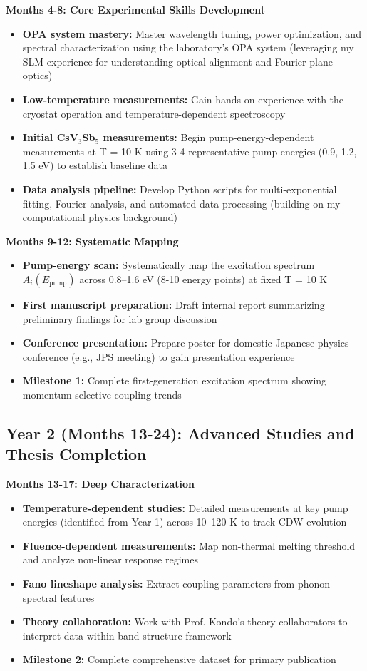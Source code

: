 \documentclass[12pt,a4paper]{article}
\begin{document}
\textbf{Months 4-8: Core Experimental Skills Development}
\begin{itemize}
    \item \textbf{OPA system mastery:} Master wavelength tuning, power optimization, and spectral characterization using the laboratory's OPA system (leveraging my SLM experience for understanding optical alignment and Fourier-plane optics)
    \item \textbf{Low-temperature measurements:} Gain hands-on experience with the cryostat operation and temperature-dependent spectroscopy
    \item \textbf{Initial CsV$_3$Sb$_5$ measurements:} Begin pump-energy-dependent measurements at T = 10 K using 3-4 representative pump energies (0.9, 1.2, 1.5 eV) to establish baseline data
    \item \textbf{Data analysis pipeline:} Develop Python scripts for multi-exponential fitting, Fourier analysis, and automated data processing (building on my computational physics background)
\end{itemize}

\textbf{Months 9-12: Systematic Mapping}
\begin{itemize}
    \item \textbf{Pump-energy scan:} Systematically map the excitation spectrum $A_i(E_{\text{pump}})$ across 0.8--1.6 eV (8-10 energy points) at fixed T = 10 K
    \item \textbf{First manuscript preparation:} Draft internal report summarizing preliminary findings for lab group discussion
    \item \textbf{Conference presentation:} Prepare poster for domestic Japanese physics conference (e.g., JPS meeting) to gain presentation experience
    \item \textbf{Milestone 1:} Complete first-generation excitation spectrum showing momentum-selective coupling trends
\end{itemize}

\subsection{Year 2 (Months 13-24): Advanced Studies and Thesis Completion}

\textbf{Months 13-17: Deep Characterization}
\begin{itemize}
    \item \textbf{Temperature-dependent studies:} Detailed measurements at key pump energies (identified from Year 1) across 10--120 K to track CDW evolution
    \item \textbf{Fluence-dependent measurements:} Map non-thermal melting threshold and analyze non-linear response regimes
    \item \textbf{Fano lineshape analysis:} Extract coupling parameters from phonon spectral features
    \item \textbf{Theory collaboration:} Work with Prof. Kondo's theory collaborators to interpret data within band structure framework
    \item \textbf{Milestone 2:} Complete comprehensive dataset for primary publication
\end{itemize}
\end{document}

